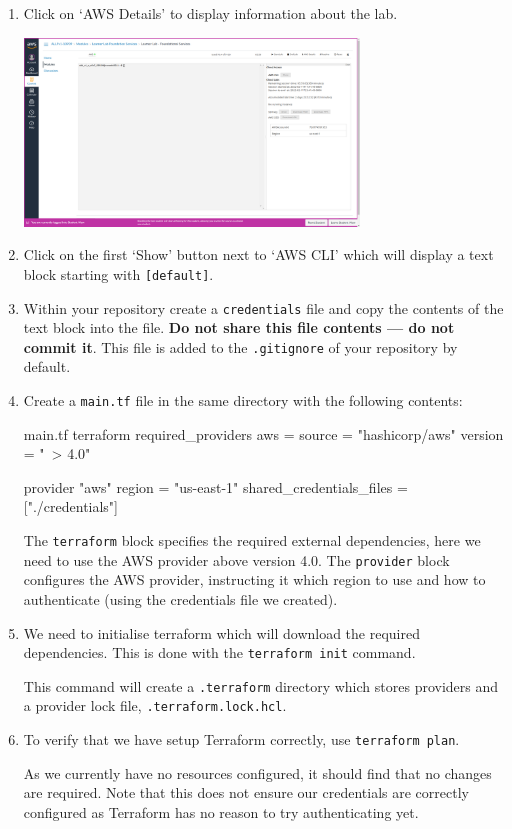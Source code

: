\documentclass{csse4400}
\begin{document}
\begin{enumerate}
\item Click on `AWS Details' to display information about the lab.

\includegraphics[width=0.7\textwidth]{images/aws-details}

\item Click on the first `Show' button next to `AWS CLI' which will display a text block starting with \texttt{[default]}.
\item Within your repository create a \texttt{credentials} file and copy the contents of the text block into the file.
\textbf{Do not share this file contents --- do not commit it}.
This file is added to the \texttt{.gitignore} of your repository by default.
\item Create a \texttt{main.tf} file in the same directory with the following contents:
\begin{code}[language=terraform,numbers=none]{main.tf}
terraform {
    required_providers {
        aws = {
            source  = "hashicorp/aws"
            version = "~> 4.0"
        }
    }
}

provider "aws" {
    region = "us-east-1"
    shared_credentials_files = ["./credentials"]
}
\end{code}

The \texttt{terraform} block specifies the required external dependencies, here we need to use the AWS provider above version 4.0.
The \texttt{provider} block configures the AWS provider, instructing it which region to use and how to authenticate (using the credentials file we created).

\item We need to initialise terraform which will download the required dependencies.
    This is done with the \texttt{terraform init} command.

This command will create a \texttt{.terraform} directory which stores providers and a provider lock file, \texttt{.terraform.lock.hcl}.

\item To verify that we have setup Terraform correctly, use \texttt{terraform plan}.

As we currently have no resources configured, it should find that no changes are required.
Note that this does not ensure our credentials are correctly configured as Terraform has no reason to try authenticating yet.

\end{enumerate}
\end{document}
